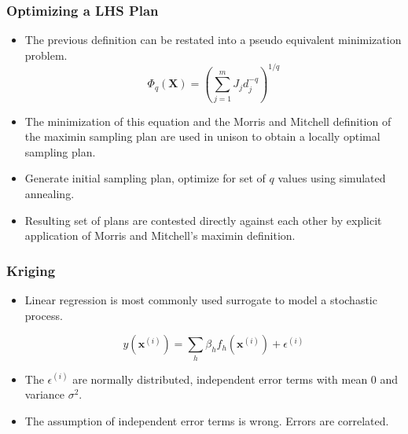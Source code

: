 \begin{frame}
\frametitle{Optimizing a LHS Plan}

\begin{itemize}
  \item The previous definition can be restated into a pseudo equivalent minimization problem.
\begin{equation}
\label{eq:Phi_q}
   \Phi_q(\textbf{X}) = \left(\sum_{j=1}^m J_j d_j^{-q} \right)^{1/q} \nonumber
\end{equation}
  \item The minimization of this equation and the Morris and Mitchell definition of the maximin sampling plan are used in unison to obtain a locally optimal sampling plan.
  \item Generate initial sampling plan, optimize for set of $q$ values using simulated annealing.  
  \item Resulting set of plans are contested directly against each other by explicit application of Morris and Mitchell's maximin definition. 
\end{itemize}

\end{frame}
\begin{frame}
\frametitle{Kriging}

\begin{itemize}
  \item Linear regression is most commonly used surrogate to model a stochastic process.

\begin{equation}
   y\left( \textbf{x}^{(i)} \right) = \sum_h \beta_h f_h\left( \textbf{x}^{(i)} \right) + \epsilon^{(i)} \nonumber
\end{equation}

  \item The $\epsilon^{(i)}$ are normally distributed, independent error terms with mean $0$ and variance $\sigma^2$.
  \item The assumption of independent error terms is wrong. Errors are correlated. 
\end{itemize}

\end{frame}
